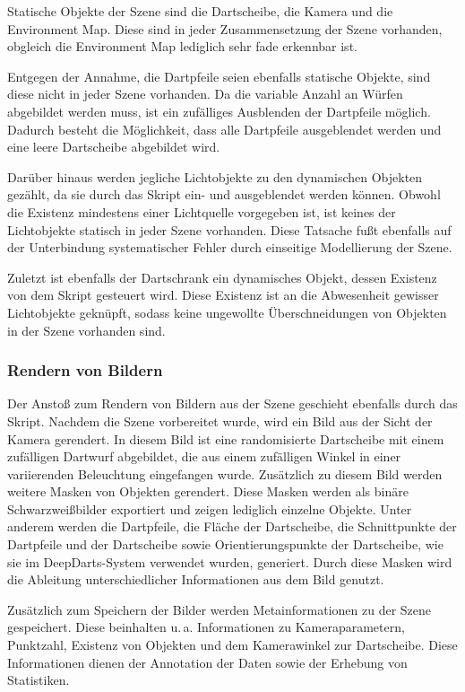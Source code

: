 Statische Objekte der Szene sind die Dartscheibe, die Kamera und die Environment Map. Diese sind in jeder Zusammensetzung der Szene vorhanden, obgleich die Environment Map lediglich sehr fade erkennbar ist.

Entgegen der Annahme, die Dartpfeile seien ebenfalls statische Objekte, sind diese nicht in jeder Szene vorhanden. Da die variable Anzahl an Würfen abgebildet werden muss, ist ein zufälliges Ausblenden der Dartpfeile möglich. Dadurch besteht die Möglichkeit, dass alle Dartpfeile ausgeblendet werden und eine leere Dartscheibe abgebildet wird.

Darüber hinaus werden jegliche Lichtobjekte zu den dynamischen Objekten gezählt, da sie durch das Skript ein- und ausgeblendet werden können. Obwohl die Existenz mindestens einer Lichtquelle vorgegeben ist, ist keines der Lichtobjekte statisch in jeder Szene vorhanden. Diese Tatsache fußt ebenfalls auf der Unterbindung systematischer Fehler durch einseitige Modellierung der Szene.

Zuletzt ist ebenfalls der Dartschrank ein dynamisches Objekt, dessen Existenz von dem Skript gesteuert wird. Diese Existenz ist an die Abwesenheit gewisser Lichtobjekte geknüpft, sodass keine ungewollte Überschneidungen von Objekten in der Szene vorhanden sind.

\subsubsection{Rendern von Bildern}

Der Anstoß zum Rendern von Bildern aus der Szene geschieht ebenfalls durch das Skript. Nachdem die Szene vorbereitet wurde, wird ein Bild aus der Sicht der Kamera gerendert. In diesem Bild ist eine randomisierte Dartscheibe mit einem zufälligen Dartwurf abgebildet, die aus einem zufälligen Winkel in einer variierenden Beleuchtung eingefangen wurde. Zusätzlich zu diesem Bild werden weitere Masken von Objekten gerendert. Diese Masken werden als binäre Schwarzweißbilder exportiert und zeigen lediglich einzelne Objekte. Unter anderem werden die Dartpfeile, die Fläche der Dartscheibe, die Schnittpunkte der Dartpfeile und der Dartscheibe sowie Orientierungspunkte der Dartscheibe, wie sie im DeepDarts-System verwendet wurden, generiert. Durch diese Masken wird die Ableitung unterschiedlicher Informationen aus dem Bild genutzt.

Zusätzlich zum Speichern der Bilder werden Metainformationen zu der Szene gespeichert. Diese beinhalten u.\,a. Informationen zu Kameraparametern, Punktzahl, Existenz von Objekten und dem Kamerawinkel zur Dartscheibe. Diese Informationen dienen der Annotation der Daten sowie der Erhebung von Statistiken.

